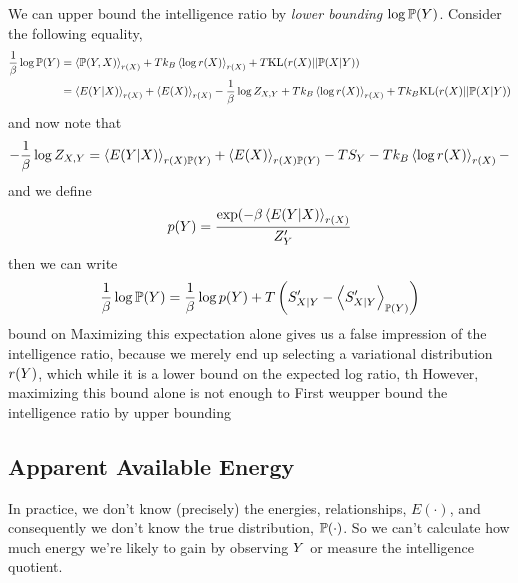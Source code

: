 \documentclass[]{article}
\begin{document}
We can upper bound the intelligence ratio by \emph{lower bounding} $\log \mathbb{P}(Y)$. Consider the following equality,
\begin{align*}
    \frac{1}{\beta}\log \mathbb{P}(Y) & = \left\langle \mathbb{P}(Y, X) \right\rangle_{r(X )} + Tk_B \left\langle \log r(X) \right\rangle_{r(X)} +  T\text{KL}(r(X)||\mathbb{P}(X|Y))\\
    & = \left\langle E(Y | X) \right\rangle_{r(X)} + \left\langle E(X) \right\rangle_{r(X)} - \frac{1}{\beta} \log Z_{X,Y} + Tk_B \left\langle \log r(X) \right\rangle_{r(X)} +  Tk_B\text{KL}(r(X)||\mathbb{P}(X|Y))
\end{align*}
and now note that
\[
- \frac{1}{\beta} \log Z_{X,Y} = \left\langle E(Y | X) \right\rangle_{r(X)\mathbb{P}(Y)} + \left\langle E(X) \right\rangle_{r(X )\mathbb{P}(Y)} - TS_Y -Tk_B \left\langle \log r(X) \right\rangle_{r(X)} - 
\]
and we define
\[
p(Y) = \frac{\exp(-\beta \left\langle E(Y | X) \right\rangle_{r(X)}}{Z^\prime_Y}
\]
then we can write
\[
\frac{1}{\beta}\log \mathbb{P}(Y) = \frac{1}{\beta}\log p(Y) + T\left(S^\prime_{X|Y} - \left\langle S^\prime_{X|Y} \right\rangle_{\mathbb{P}(Y)}\right) 
\]
bound on Maximizing this expectation alone gives us a false impression of the intelligence ratio, because we merely end up selecting a variational distribution $r(Y)$, which while it is a lower bound on the expected log ratio, th However, maximizing this bound alone is not enough to  
First weupper bound the intelligence ratio by upper bounding

\subsection{Apparent Available Energy}

In practice, we don't know (precisely) the energies, relationships,
\(E(\cdot)\), and consequently we don't know the true distribution,
\(\mathbb{P}(\cdot)\). So we can't calculate how much energy we're likely
to gain by observing \(Y\) or measure the intelligence quotient.
\end{document}
